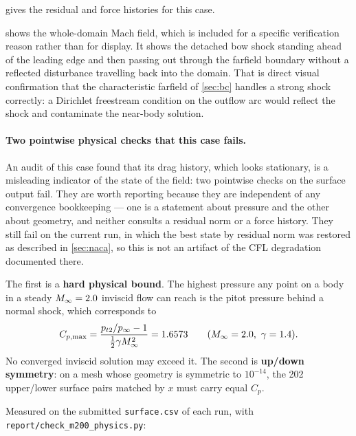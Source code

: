  gives the residual and force histories for this case.

 shows the whole-domain Mach field, which is
included for a specific verification reason rather than for display. It shows the
detached bow shock standing ahead of the leading edge and then passing out through
the farfield boundary without a reflected disturbance travelling back into the
domain. That is direct visual confirmation that the characteristic farfield of
\cref{sec:bc} handles a strong shock correctly: a Dirichlet freestream condition
on the outflow arc would reflect the shock and contaminate the near-body solution.

\paragraph{Two pointwise physical checks that this case fails.}
\label{sec:m200asym}
An audit of this case found that its drag history, which looks stationary, is a misleading
indicator of the state of the field: two pointwise checks on the surface output fail. They
are worth reporting because they are independent of any convergence bookkeeping --- one is a
statement about pressure and the other about geometry, and neither consults a residual norm
or a force history. They still fail on the current run, in which the best state by residual
norm was restored as described in \cref{sec:naca}, so this is not an artifact of the CFL
degradation documented there.

The first is a \textbf{hard physical bound}. The highest pressure any
point on a body in a steady $M_\infty=2.0$ inviscid flow can reach is the pitot
pressure behind a normal shock, which corresponds to
\begin{equation}
  C_{p,\max}=\frac{p_{t2}/p_\infty-1}{\tfrac12\gamma M_\infty^2}=1.6573
  \qquad (M_\infty=2.0,\ \gamma=1.4).
  \label{eq:pitot}
\end{equation}
No converged inviscid solution may exceed it. The second is \textbf{up/down symmetry}:
on a mesh whose geometry is symmetric to $10^{-14}$, the 202 upper/lower surface pairs
matched by $x$ must carry equal $C_p$.

Measured on the submitted \texttt{surface.csv} of each run, with
\texttt{report/check\_m200\_physics.py}:

